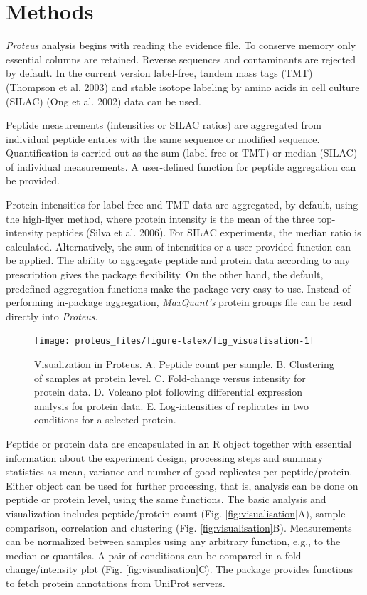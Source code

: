 \documentclass[]{article}
\begin{document}
\section{Methods}\label{methods}

\emph{Proteus} analysis begins with reading the evidence file. To
conserve memory only essential columns are retained. Reverse sequences
and contaminants are rejected by default. In the current version
label-free, tandem mass tags (TMT) (Thompson et al. 2003) and stable
isotope labeling by amino acids in cell culture (SILAC) (Ong et al.
2002) data can be used.

Peptide measurements (intensities or SILAC ratios) are aggregated from
individual peptide entries with the same sequence or modified sequence.
Quantification is carried out as the sum (label-free or TMT) or median
(SILAC) of individual measurements. A user-defined function for peptide
aggregation can be provided.

Protein intensities for label-free and TMT data are aggregated, by
default, using the high-flyer method, where protein intensity is the
mean of the three top-intensity peptides (Silva et al. 2006). For SILAC
experiments, the median ratio is calculated. Alternatively, the sum of
intensities or a user-provided function can be applied. The ability to
aggregate peptide and protein data according to any prescription gives
the package flexibility. On the other hand, the default, predefined
aggregation functions make the package very easy to use. Instead of
performing in-package aggregation, \emph{MaxQuant's} protein groups file
can be read directly into \emph{Proteus}.

\begin{figure}[H]

{\centering \texttt{[image: proteus\_files/figure-latex/fig\_visualisation-1]} 

}

\caption{\label{fig:visualisation}Visualization in Proteus. A. Peptide count per sample. B. Clustering of samples at protein level. C. Fold-change versus intensity for protein data. D. Volcano plot following differential expression analysis for protein data. E. Log-intensities of replicates in two conditions for a selected protein.}\label{fig:fig_visualisation}
\end{figure}

Peptide or protein data are encapsulated in an R object together with
essential information about the experiment design, processing steps and
summary statistics as mean, variance and number of good replicates per
peptide/protein. Either object can be used for further processing, that
is, analysis can be done on peptide or protein level, using the same
functions. The basic analysis and visualization includes peptide/protein
count (Fig. \ref{fig:visualisation}A), sample comparison, correlation
and clustering (Fig. \ref{fig:visualisation}B). Measurements can be
normalized between samples using any arbitrary function, e.g., to the
median or quantiles. A pair of conditions can be compared in a
fold-change/intensity plot (Fig. \ref{fig:visualisation}C). The package
provides functions to fetch protein annotations from UniProt servers.
\end{document}
